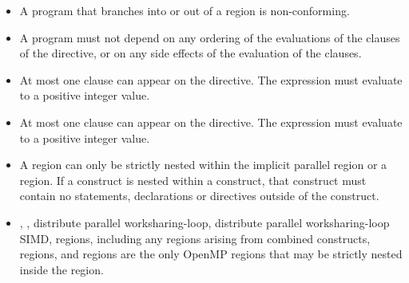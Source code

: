 \begin{itemize}
\item A program that branches into or out of a  region is non-conforming.
\item A program must not depend on any ordering of the evaluations of the clauses 
      of the  directive, or on any side effects of the evaluation of 
      the clauses.
\item At most one  clause can appear on the directive. The
       expression must evaluate to a positive integer value.
\item At most one  clause can appear on the directive. The 
       expression must evaluate to a positive integer value.
\item A  region can only be strictly nested within the implicit 
      parallel region or a  region. If a  construct 
      is nested within a  construct, that  construct 
      must contain no statements, declarations or directives outside of the 
       construct. \item {}, , 
      distribute parallel worksharing-loop, distribute parallel worksharing-loop 
      SIMD,  regions, including any  regions arising 
      from combined constructs,  regions, and 
       regions are the only OpenMP regions that may be 
      strictly nested inside the  region.
\end{itemize}

